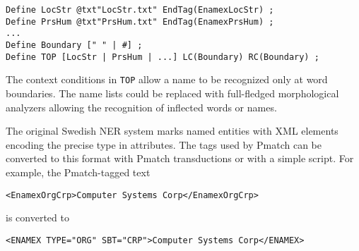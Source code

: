 \documentclass{llncs}
\begin{document}
\begin{verbatim}
Define LocStr @txt"LocStr.txt" EndTag(EnamexLocStr) ;
Define PrsHum @txt"PrsHum.txt" EndTag(EnamexPrsHum) ;
...
Define Boundary [" " | #] ;
Define TOP [LocStr | PrsHum | ...] LC(Boundary) RC(Boundary) ;
\end{verbatim}

\noindent
The context conditions in \texttt{TOP} allow a name to be recognized
only at word boundaries. The name lists could be replaced with
full-fledged morphological analyzers allowing the recognition
of inflected words or names.



The original Swedish NER system marks named entities with XML elements
encoding the precise type in attributes. The tags used by Pmatch can
be converted to this format with Pmatch transductions or with a simple
script. For example, the Pmatch-tagged text
%
\begin{verbatim}
<EnamexOrgCrp>Computer Systems Corp</EnamexOrgCrp>
\end{verbatim}
is converted to
\begin{verbatim}
<ENAMEX TYPE="ORG" SBT="CRP">Computer Systems Corp</ENAMEX>
\end{verbatim}
\end{document}
